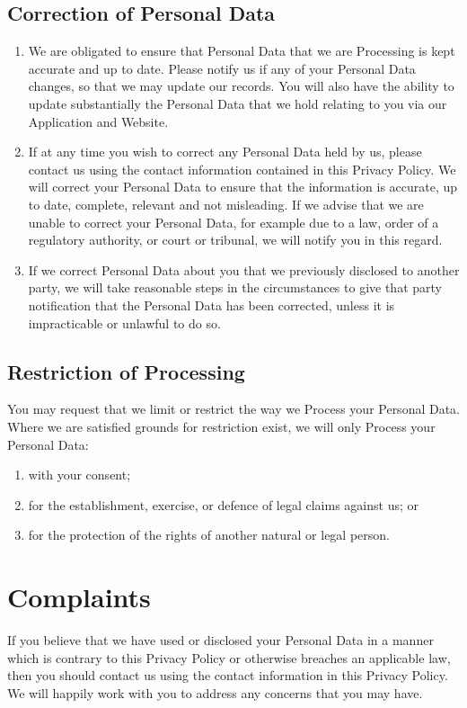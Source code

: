 \documentclass[10pt]{article}
\begin{document}
\subsection{Correction of Personal Data}
\begin{enumerate}[(1)]
	\item We are obligated to ensure that Personal Data that we are Processing is kept accurate and up to date. Please notify us if any of your Personal Data changes, so that we may update our records. You will also have the ability to update substantially the Personal Data that we hold relating to you via our Application and Website.

	\item If at any time you wish to correct any Personal Data held by us, please contact us using the contact information contained in this Privacy Policy. We will correct your Personal Data to ensure that the information is accurate, up to date, complete, relevant and not misleading. If we advise that we are unable to correct your Personal Data, for example due to a law, order of a regulatory authority, or court or tribunal, we will notify you in this regard.

	\item If we correct Personal Data about you that we previously disclosed to another party, we will take reasonable steps in the circumstances to give that party notification that the Personal Data has been corrected, unless it is impracticable or unlawful to do so.
\end{enumerate}

\subsection{Restriction of Processing}
You may request that we limit or restrict the way we Process your Personal Data. Where we are satisfied grounds for restriction exist, we will only Process your Personal Data:
\begin{enumerate}[(1)]
	\item with your consent;

	\item for the establishment, exercise, or defence of legal claims against us; or

	\item for the protection of the rights of another natural or legal person.
\end{enumerate}


\section{Complaints}
If you believe that we have used or disclosed your Personal Data in a manner which is contrary to this Privacy Policy or otherwise breaches an applicable law, then you should contact us using the contact information in this Privacy Policy. We will happily work with you to address any concerns that you may have. \\
\end{document}

